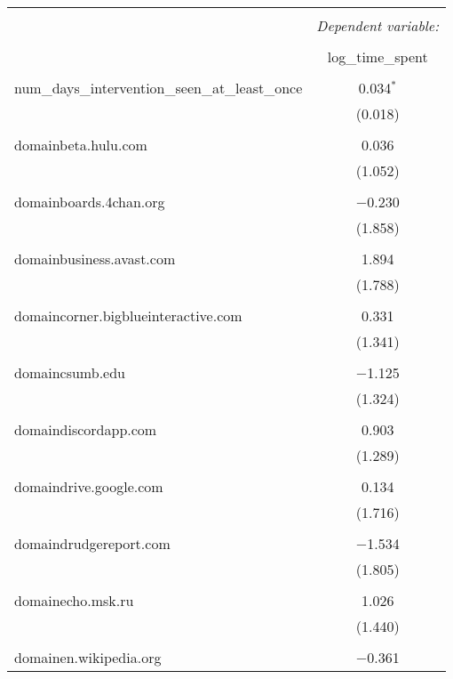 \begin{table}[!htbp] \centering 
  \caption{} 
  \label{} 
\begin{tabular}{@{\extracolsep{5pt}}lc} 
\\[-1.8ex]\hline 
\hline \\[-1.8ex] 
 & \multicolumn{1}{c}{\textit{Dependent variable:}} \\ 
\cline{2-2} 
\\[-1.8ex] & log\_time\_spent \\ 
\hline \\[-1.8ex] 
 num\_days\_intervention\_seen\_at\_least\_once & 0.034$^{*}$ \\ 
  & (0.018) \\ 
  & \\ 
 domainbeta.hulu.com & 0.036 \\ 
  & (1.052) \\ 
  & \\ 
 domainboards.4chan.org & $-$0.230 \\ 
  & (1.858) \\ 
  & \\ 
 domainbusiness.avast.com & 1.894 \\ 
  & (1.788) \\ 
  & \\ 
 domaincorner.bigblueinteractive.com & 0.331 \\ 
  & (1.341) \\ 
  & \\ 
 domaincsumb.edu & $-$1.125 \\ 
  & (1.324) \\ 
  & \\ 
 domaindiscordapp.com & 0.903 \\ 
  & (1.289) \\ 
  & \\ 
 domaindrive.google.com & 0.134 \\ 
  & (1.716) \\ 
  & \\ 
 domaindrudgereport.com & $-$1.534 \\ 
  & (1.805) \\ 
  & \\ 
 domainecho.msk.ru & 1.026 \\ 
  & (1.440) \\ 
  & \\ 
 domainen.wikipedia.org & $-$0.361 \\ 

\end{tabular}
\end{table}
